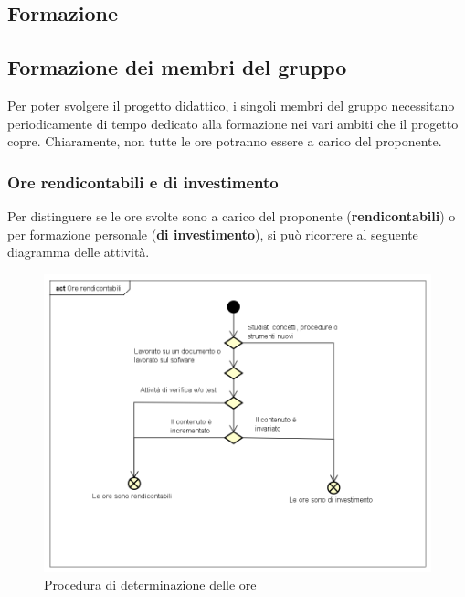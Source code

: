 \documentclass[../NormeProgetto.tex]{subfiles}
\begin{document}
	\subsection{Formazione}
		\subsection{Formazione dei membri del gruppo}
			Per poter svolgere il progetto didattico, i singoli membri del gruppo necessitano periodicamente di tempo dedicato alla formazione nei vari ambiti che il progetto copre. Chiaramente, non tutte le ore potranno essere a carico del proponente.
			\subsubsection{Ore rendicontabili e di investimento}
				Per distinguere se le ore svolte sono a carico del proponente (\textbf{rendicontabili}) o per formazione personale (\textbf{di investimento}), si può ricorrere al seguente diagramma delle attività.
			\begin{figure}[H]
					\centering
					\includegraphics[scale=0.5, width=\textwidth]{sections/img/oreRendicontabili.png}
					\caption{Procedura di determinazione delle ore}\label{fig:Procedura di determinazione delle ore} 
				\end{figure}
				
\end{document}
